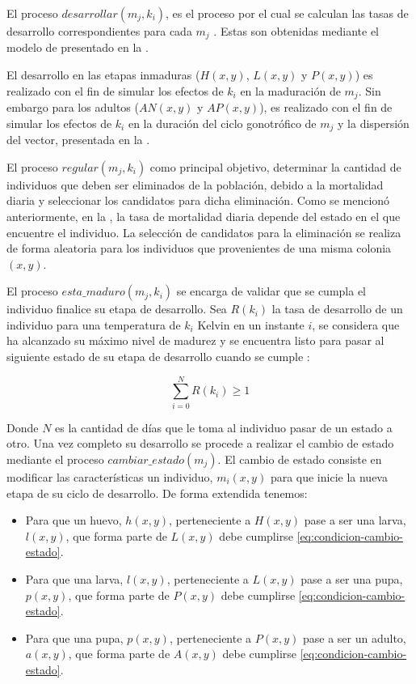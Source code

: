 El proceso $desarrollar(m_{j}, k_{i})$, es el proceso por el cual se calculan las tasas de
desarrollo correspondientes para cada $m_{j}$ . Estas son obtenidas mediante el modelo de
\cite{sharpe1977reaction} presentado en la .

El desarrollo en las etapas inmaduras ($H(x, y)$, $L(x, y)$ y $P(x, y)$) es realizado con el fin de
simular los efectos de $k_{i}$ en la maduración de $m_{j}$. Sin embargo para los adultos ($AN(x, y)$
y $AP(x, y)$), es realizado con el fin de simular los efectos de $k_{i}$ en la duración del ciclo
gonotrófico de $m_{j}$ y la dispersión del vector, presentada en la
.

El proceso $regular(m_{j}, k_{i})$ como principal objetivo, determinar la cantidad de individuos
que deben ser eliminados de la población, debido a la mortalidad diaria y seleccionar los
candidatos para dicha eliminación. Como se mencionó anteriormente, en la
, la tasa de mortalidad diaria depende del estado en el que
encuentre el individuo. La selección de candidatos para la eliminación se realiza de forma
aleatoria para los individuos que provenientes de una misma colonia $(x, y)$.

El proceso $esta\_maduro(m_{j}, k_{i})$ se encarga de validar que se cumpla el individuo finalice
su etapa de desarrollo. Sea $R(k_{i})$ la tasa de desarrollo de un individuo para una temperatura
de $k_{i}$ Kelvin en un instante $i$, se considera que ha alcanzado su máximo nivel de madurez y
se encuentra listo para pasar al siguiente estado de su etapa de desarrollo cuando se cumple :

\begin{equation}
\label{eq:condicion-cambio-estado}
    \sum_{i=0}^{N} R(k_{i}) \geq 1
\end{equation}

Donde $N$ es la cantidad de días que le toma al individuo pasar de un estado a otro. Una vez
completo su desarrollo se procede a realizar el cambio de estado mediante el proceso
$cambiar\_estado(m_{j})$. El cambio de estado consiste en modificar las características un
individuo, $m_{i}(x, y)$ para que inicie la nueva etapa de su ciclo de desarrollo. De forma
extendida tenemos:

\begin{itemize}
\item Para que un huevo, $h(x,y)$, perteneciente a $H(x,y)$ pase a ser una larva, $l(x, y)$, que forma parte de $L(x, y)$ debe cumplirse \eqref{eq:condicion-cambio-estado}.

\item Para que una larva, $l(x,y)$, perteneciente a $L(x,y)$ pase a ser una pupa, $p(x, y)$, que forma parte de $P(x, y)$ debe cumplirse \eqref{eq:condicion-cambio-estado}.

\item Para que una pupa, $p(x,y)$, perteneciente a $P(x,y)$ pase a ser un adulto, $a(x, y)$, que forma parte de $A(x, y)$ debe cumplirse \eqref{eq:condicion-cambio-estado}.
\end{itemize}


